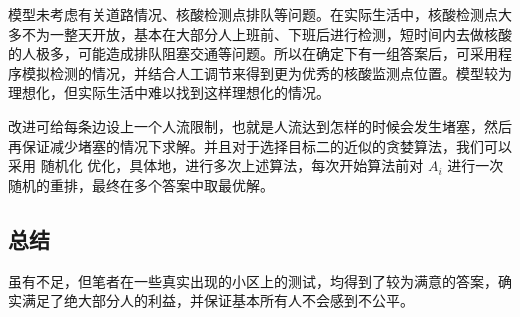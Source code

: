 \documentclass{cumcmthesis}
\begin{document}
模型未考虑有关道路情况、核酸检测点排队等问题。在实际生活中，核酸检测点大多不为一整天开放，基本在大部分人上班前、下班后进行检测，短时间内去做核酸的人极多，可能造成排队阻塞交通等问题。所以在确定下有一组答案后，可采用程序模拟检测的情况，并结合人工调节来得到更为优秀的核酸监测点位置。模型较为理想化，但实际生活中难以找到这样理想化的情况。

改进可给每条边设上一个人流限制，也就是人流达到怎样的时候会发生堵塞，然后再保证减少堵塞的情况下求解。并且对于选择目标二的近似的贪婪算法，我们可以采用 $\textbf{随机化}$ 优化，具体地，进行多次上述算法，每次开始算法前对 $A_i$ 进行一次随机的重排，最终在多个答案中取最优解。

\subsection{总结}

虽有不足，但笔者在一些真实出现的小区上的测试，均得到了较为满意的答案，确实满足了绝大部分人的利益，并保证基本所有人不会感到不公平。

\newpage


\newpage
\end{document}
